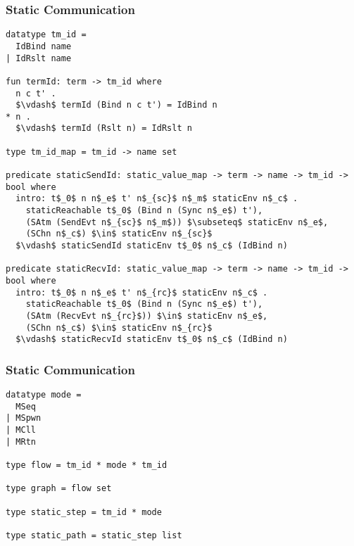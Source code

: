 \documentclass{beamer}
\begin{document}
\begin{frame}[fragile]
	\frametitle{Static Communication}
\begin{lstlisting}[language=logic, mathescape]
datatype tm_id =
  IdBind name
| IdRslt name 

fun termId: term -> tm_id where
  n c t' . 
  $\vdash$ termId (Bind n c t') = IdBind n
* n . 
  $\vdash$ termId (Rslt n) = IdRslt n

type tm_id_map = tm_id -> name set

predicate staticSendId: static_value_map -> term -> name -> tm_id -> bool where
  intro: t$_0$ n n$_e$ t' n$_{sc}$ n$_m$ staticEnv n$_c$ .
    staticReachable t$_0$ (Bind n (Sync n$_e$) t'),
    (SAtm (SendEvt n$_{sc}$ n$_m$)) $\subseteq$ staticEnv n$_e$, 
    (SChn n$_c$) $\in$ staticEnv n$_{sc}$
  $\vdash$ staticSendId staticEnv t$_0$ n$_c$ (IdBind n)

predicate staticRecvId: static_value_map -> term -> name -> tm_id -> bool where
  intro: t$_0$ n n$_e$ t' n$_{rc}$ staticEnv n$_c$ .
    staticReachable t$_0$ (Bind n (Sync n$_e$) t'),
    (SAtm (RecvEvt n$_{rc}$)) $\in$ staticEnv n$_e$, 
    (SChn n$_c$) $\in$ staticEnv n$_{rc}$ 
  $\vdash$ staticRecvId staticEnv t$_0$ n$_c$ (IdBind n)
\end{lstlisting}
\end{frame}




\begin{frame}[fragile]
	\frametitle{Static Communication}
\begin{lstlisting}[language=logic, mathescape]
datatype mode =
  MSeq
| MSpwn
| MCll
| MRtn

type flow = tm_id * mode * tm_id

type graph = flow set

type static_step = tm_id * mode

type static_path = static_step list
\end{lstlisting}
\end{frame}
\end{document}
